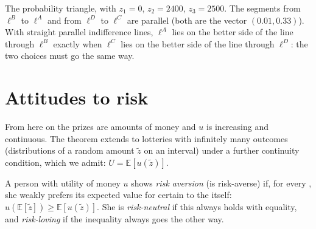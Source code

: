 \begin{omfigure}

{\small The probability triangle, with $z_1 = 0$, $z_2 = \num{2400}$, $z_3 = \num{2500}$. The segments
from $\ell^{B}$ to $\ell^{A}$ and from $\ell^{D}$ to $\ell^{C}$ are parallel (both are the vector
$(0.01, 0.33)$). With straight parallel indifference lines, $\ell^{A}$ lies on the better side of the
line through $\ell^{B}$ exactly when $\ell^{C}$ lies on the better side of the line through
$\ell^{D}$: the two choices must go the same way.}
\end{omfigure}

\section{Attitudes to risk}\label{sec:b2:expected-utility:attitudes}

From here on the prizes are amounts of money and $u$ is increasing and continuous. The theorem extends
to lotteries with infinitely many outcomes (distributions of a random amount $\tilde z$ on an
interval) under a further continuity condition, which we admit: $U = \mathbb{E}[u(\tilde z)]$.

\begin{definition}\label{def:b2:expected-utility:risk-aversion}
A person with utility of money $u$ shows \emph{risk aversion} (is risk-averse) if,
for every , she weakly prefers its expected value for certain to the  itself:
$u(\mathbb{E}[\tilde z]) \ge \mathbb{E}[u(\tilde z)]$. She is \emph{risk-neutral} if this always holds
with equality, and \emph{risk-loving} if the inequality always goes the other way.
\end{definition}

